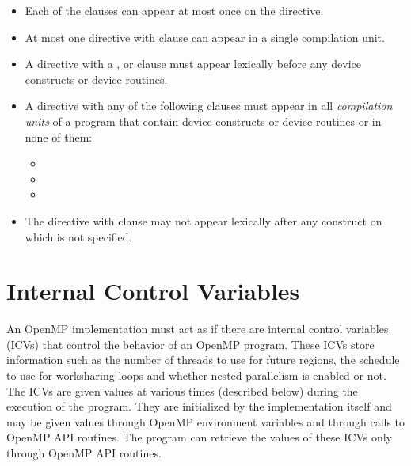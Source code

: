 \begin{itemize}

\item Each of the clauses can appear at most once on the directive.

\item At most one  directive with  
      clause can appear in a single compilation
unit.

\item A  directive with a ,
       or  clause must 
      appear lexically before any device constructs or device routines.

\item A  directive with any of the following clauses must appear 
      in all \emph{compilation units} of a program that contain device
      constructs or device routines or in none of them:

 \begin{itemize}
   \item {}
   \item {}
   \item {}
 \end{itemize}

\item The  directive with 
clause may not appear lexically after any  construct on which
 is not specified.

\end{itemize}


\section{Internal Control Variables}
\label{sec:Internal Control Variables}

An OpenMP implementation must act as if there are internal control variables (ICVs)
that control the behavior of an OpenMP program. These ICVs store information such as
the number of threads to use for future  regions, the schedule to use 
for worksharing loops and whether nested parallelism is enabled or not. The ICVs are 
given values at various times (described below) during the execution of the program. 
They are initialized by the implementation itself and may be given values through 
OpenMP environment variables and through calls to OpenMP API routines. The program 
can retrieve the values of these ICVs only through OpenMP API routines.

